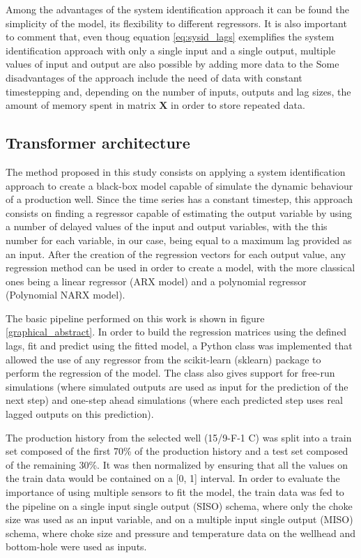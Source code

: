 \documentclass[conference]{IEEEtran}
\begin{document}
Among the advantages of the system identification approach it can be found the simplicity of the model,
its flexibility to different regressors. It is also important to comment that, even thoug equation \ref{eq:sysid_lags}
exemplifies the system identification approach with only a single input and a single output, multiple values of input and
output are also possible by adding more data to the
Some disadvantages of the approach include the need of data
with constant timestepping and, depending on the number of inputs, outputs and lag sizes, the amount of
memory spent in matrix $\mathbf{X}$ in order to store repeated data.

\subsection{Transformer architecture}

The method proposed in this study consists on applying a system identification approach to create a black-box model capable of simulate the dynamic behaviour of a production well. Since the time series has a constant timestep, this approach consists on finding a regressor capable of estimating the output variable by using a number of delayed values of the input and output variables, with the this number for each variable, in our case, being equal to a maximum lag provided as an input. After the creation of the regression vectors for each output value, any regression method can be used in order to create a model, with the more classical ones being a linear regressor (ARX model) and a polynomial regressor (Polynomial NARX model).

The basic pipeline performed on this work is shown in figure \ref{graphical_abstract}. In order to build the regression matrices using the defined lags, fit and predict using the fitted model, a Python class was implemented that allowed the use of any regressor from the scikit-learn (sklearn) \cite{scikit-learn} package to perform the regression of the model. The class also gives support for free-run simulations (where simulated outputs are used as input for the prediction of the next step) and one-step ahead simulations (where each predicted step uses real lagged outputs on this prediction). 

The production history from the selected well (15/9-F-1 C) was split into a train set composed of the first 70\% of the production history and a test set composed of the remaining 30\%. It was then normalized by ensuring that all the values on the train data would be contained on a [0, 1] interval. In order to evaluate the importance of using multiple sensors to fit the model, the train data was fed to the pipeline on a single input single output (SISO) schema, where only the choke size was used as an input variable, and on a multiple input single output (MISO) schema, where choke size and pressure and temperature data on the wellhead and bottom-hole were used as inputs.
\end{document}
